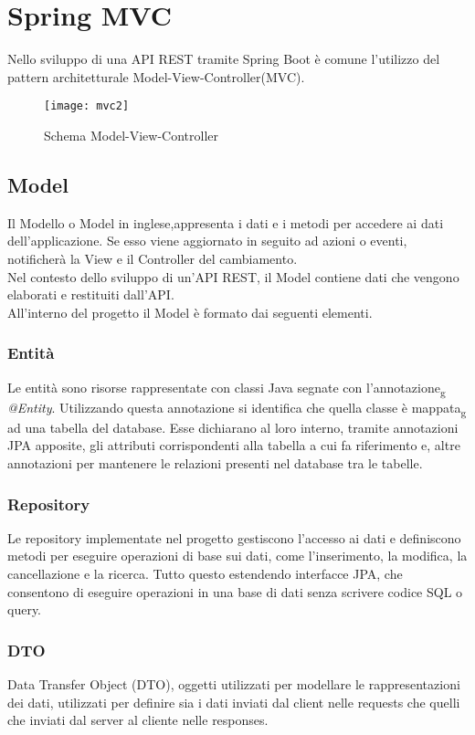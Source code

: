 \section{Spring MVC}
Nello sviluppo di una API REST tramite Spring Boot è comune l'utilizzo del pattern architetturale Model-View-Controller(MVC).\\

\begin{figure}[H] 
    \centering 
    \texttt{[image: mvc2]} 
    \caption{Schema Model-View-Controller}
\end{figure}

\subsection{Model}
Il Modello o Model in inglese,appresenta i dati e i metodi per accedere ai dati dell'applicazione. Se esso viene aggiornato in seguito ad azioni o eventi, notificherà la View e il Controller del cambiamento.\\
Nel contesto dello sviluppo di un'API REST, il Model contiene dati che vengono elaborati e restituiti dall'API.\\
All'interno del progetto il Model è formato dai seguenti elementi.
\subsubsection*{Entità}
Le entità sono risorse rappresentate con classi Java segnate con l'annotazione\textsubscript{g} \textit{@Entity}. Utilizzando questa annotazione si identifica che quella classe è mappata\textsubscript{g} ad una tabella del database. Esse dichiarano al loro interno, tramite annotazioni JPA apposite, gli attributi corrispondenti alla tabella a cui fa riferimento e, altre annotazioni per mantenere le relazioni presenti nel database tra le tabelle.
\subsubsection*{Repository}
Le repository implementate nel progetto gestiscono l'accesso ai dati e definiscono metodi per eseguire operazioni di base sui dati, come l'inserimento, la modifica, la cancellazione e la ricerca. Tutto questo estendendo interfacce JPA, che consentono di eseguire operazioni in una base di dati senza scrivere codice SQL o query.
\subsubsection*{DTO}
Data Transfer Object (DTO), oggetti utilizzati per modellare le rappresentazioni dei dati, utilizzati per definire sia i dati inviati dal client nelle requests che quelli che inviati dal server al cliente nelle responses.\\


